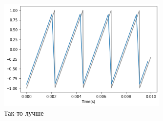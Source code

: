 \documentclass[a4paper, 12pt]{report}
\begin{document}
	\begin{figure}[H]
		\centering
		\includegraphics[width=0.75\textwidth]{test7.png}
		\caption{Так-то лучше}
		\label{fig:test7}
	\end{figure}
\end{document}
